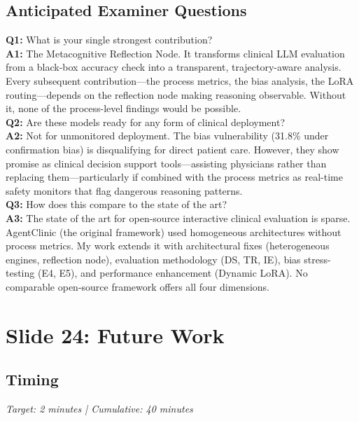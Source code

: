 \documentclass[12pt]{article}
\begin{document}
  \subsection*{Anticipated Examiner Questions}
  \begin{qabox}
  \textbf{Q1:} What is your single strongest contribution? \\
  \textbf{A1:} The Metacognitive Reflection Node. It transforms clinical LLM evaluation from a black-box accuracy check into a transparent, trajectory-aware analysis. Every subsequent contribution---the process metrics, the bias analysis, the LoRA routing---depends on the reflection node making reasoning observable. Without it, none of the process-level findings would be possible. \\[6pt]
  \textbf{Q2:} Are these models ready for any form of clinical deployment? \\
  \textbf{A2:} Not for unmonitored deployment. The bias vulnerability (31.8\% under confirmation bias) is disqualifying for direct patient care. However, they show promise as clinical decision support tools---assisting physicians rather than replacing them---particularly if combined with the process metrics as real-time safety monitors that flag dangerous reasoning patterns. \\[6pt]
  \textbf{Q3:} How does this compare to the state of the art? \\
  \textbf{A3:} The state of the art for open-source interactive clinical evaluation is sparse. AgentClinic (the original framework) used homogeneous architectures without process metrics. My work extends it with architectural fixes (heterogeneous engines, reflection node), evaluation methodology (DS, TR, IE), bias stress-testing (E4, E5), and performance enhancement (Dynamic LoRA). No comparable open-source framework offers all four dimensions.
  \end{qabox}



  \section{Slide 24: Future Work}

  \subsection*{Timing}
  \textit{Target: 2 minutes | Cumulative: 40 minutes}
\end{document}
